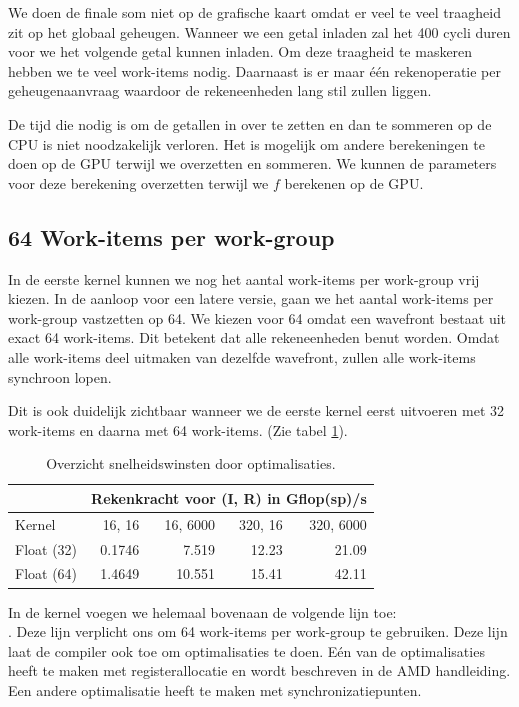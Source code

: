 We doen de finale som niet op de grafische kaart omdat er veel te veel traagheid zit op het globaal geheugen. Wanneer we een getal inladen zal het 400 cycli duren voor we het volgende getal kunnen inladen. Om deze traagheid te maskeren hebben we te veel work-items nodig. Daarnaast is er maar \'e\'en rekenoperatie per geheugenaanvraag waardoor de rekeneenheden lang stil zullen liggen. 

De tijd die nodig is om de getallen in  over te zetten en dan te sommeren op de CPU is niet noodzakelijk verloren. Het is mogelijk om andere berekeningen te doen op de GPU terwijl we  overzetten en sommeren. We kunnen de parameters voor deze berekening overzetten terwijl we $f$ berekenen op de GPU.

\subsection{64 Work-items per work-group}
In de eerste kernel kunnen we nog het aantal work-items per work-group vrij kiezen. In de aanloop voor een latere versie, gaan we het aantal work-items per work-group vastzetten op 64. We kiezen voor 64 omdat een wavefront bestaat uit exact 64 work-items. Dit betekent dat alle rekeneenheden benut worden. Omdat alle work-items deel uitmaken van dezelfde wavefront, zullen alle work-items synchroon lopen.

Dit is ook duidelijk zichtbaar wanneer we de eerste kernel eerst uitvoeren met 32 work-items en daarna met 64 work-items. (Zie tabel \ref{measF3264}).

\begin{table}
	\centering
    \begin{tabular}{|l| r|r| r |r|}
		\hline
						& \multicolumn{4}{c|}{Rekenkracht voor (I, R) in Gflop(sp)/s}\\
		\hline
		Kernel          & 16, 16 	& 16, 6000	& 320, 16	&  320, 6000 \\
		\hline
		Float (32)      & 0.1746  	& 7.519   	& 12.23 	& 21.09 	\\
		Float (64)      & 1.4649	& 10.551  	& 15.41  	& 42.11  	\\
		\hline
    \end{tabular}
    \caption{\label{measF3264} Overzicht snelheidswinsten door optimalisaties.}
\end{table} 

In de kernel voegen we helemaal bovenaan de volgende lijn toe:\\ . Deze lijn verplicht ons om 64 work-items per work-group te gebruiken. Deze lijn laat de compiler ook toe om optimalisaties te doen. E\'en van de optimalisaties heeft te maken met registerallocatie en wordt beschreven in de AMD handleiding\cite[p.~6-27]{ amd}. Een andere optimalisatie heeft te maken met synchronizatiepunten.

